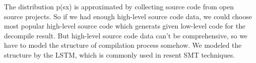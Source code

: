 The distribution p(sx) is approximated by collecting source code from open source projects.
So if we had enough high-level source code data, we could choose most popular high-level source code which generats given low-level code for the decompile result.
But high-level source code data can't be comprehensive, so we have to model the structure of compilation process somehow.
We modeled the structure by the LSTM, which is commonly used in resent SMT techniques.



